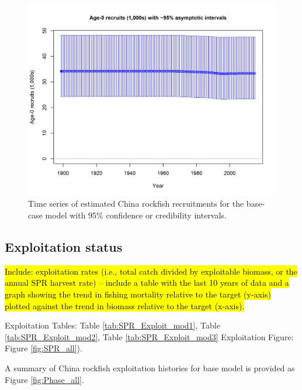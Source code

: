 \documentclass[12pt,]{article}
\begin{document}
\begin{figure}[htbp]
\centering
\includegraphics{r4ss/plots_mod1/ts11_Age-0_recruits_(1000s)_with_95_asymptotic_intervals.png}
\caption{Time series of estimated China rockfish recruitments for the
base-case model with 95\% confidence or credibility intervals.
\label{fig:Recruits_all}}
\end{figure}

\FloatBarrier

\subsection*{Exploitation status}\label{exploitation-status}

\hl{Include: exploitation rates (i.e., total catch divided by exploitable biomass, or the annual SPR harvest rate) – include a table with the last 10 years of data and a graph showing the trend in fishing mortality relative to the target (y-axis) plotted against the trend in biomass relative to the target (x-axis).}

Exploitation Tables: Table \ref{tab:SPR_Exploit_mod1}, Table
\ref{tab:SPR_Exploit_mod2}, Table \ref{tab:SPR_Exploit_mod3}
Exploitation Figure: Figure \ref{fig:SPR_all}).

A summary of China rockfish exploitation histories for base model is
provided as Figure \ref{fig:Phase_all}.

\FloatBarrier
\end{document}

